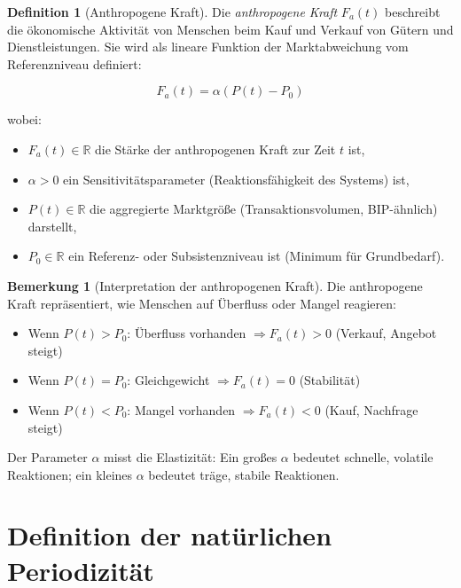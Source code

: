 \documentclass[a4paper,11pt]{report}
\theoremstyle{definition}
\newtheorem{definition}{Definition}[chapter]
\newtheorem{bemerkung}{Bemerkung}[chapter]
\begin{document}
\begin{definition}[Anthropogene Kraft]\label{def:anthropogene}
    Die \emph{anthropogene Kraft} $F_a(t)$ beschreibt die ökonomische Aktivität von Menschen beim Kauf und Verkauf von Gütern und Dienstleistungen. Sie wird als lineare Funktion der Marktabweichung vom Referenzniveau definiert:
    
    \begin{equation}
        \boxed{F_a(t) = \alpha(P(t) - P_0)}
        \label{eq:anthropogene}
    \end{equation}
    
    wobei:
    \begin{itemize}
        \item $F_a(t) \in \mathbb{R}$ die Stärke der anthropogenen Kraft zur Zeit $t$ ist,
        \item $\alpha > 0$ ein Sensitivitätsparameter (Reaktionsfähigkeit des Systems) ist,
        \item $P(t) \in \mathbb{R}$ die aggregierte Marktgröße (Transaktionsvolumen, BIP-ähnlich) darstellt,
        \item $P_0 \in \mathbb{R}$ ein Referenz- oder Subsistenzniveau ist (Minimum für Grundbedarf).
    \end{itemize}
\end{definition}

\begin{bemerkung}[Interpretation der anthropogenen Kraft]
    
    Die anthropogene Kraft repräsentiert, wie Menschen auf Überfluss oder Mangel reagieren:
    
    \begin{itemize}
        \item Wenn $P(t) > P_0$: Überfluss vorhanden $\Rightarrow F_a(t) > 0$ (Verkauf, Angebot steigt)
        \item Wenn $P(t) = P_0$: Gleichgewicht $\Rightarrow F_a(t) = 0$ (Stabilität)
        \item Wenn $P(t) < P_0$: Mangel vorhanden $\Rightarrow F_a(t) < 0$ (Kauf, Nachfrage steigt)
    \end{itemize}
    
    Der Parameter $\alpha$ misst die Elastizität: Ein großes $\alpha$ bedeutet schnelle, volatile Reaktionen; ein kleines $\alpha$ bedeutet träge, stabile Reaktionen.
\end{bemerkung}

\section{Definition der natürlichen Periodizität}
\end{document}
